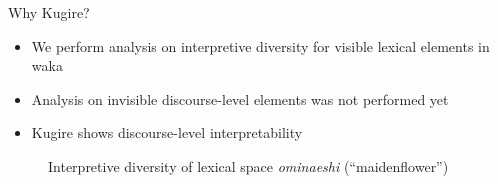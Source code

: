 \begin{block}{Why Kugire?}
\begin{itemize}
\item We perform analysis on interpretive diversity for visible lexical elements in waka
\item Analysis on invisible discourse-level elements was not performed yet
\item Kugire shows discourse-level interpretability
\end{itemize}

\vspace{-\dimexpr\parskip+\topsep+\partopsep+\parsep+.65\baselineskip\relax}
{\setlength{\intextsep}{0pt}%
\setlength{\textfloatsep}{0pt}%
\setlength{\floatsep}{0pt}%
\begin{figure}[H]
\begin{minipage}[t]{0.55\linewidth}
  \centering
  
  \setcounter{figure}{1}
  \caption{Interpretive diversity of the predicate of \textit{miru} (see)}
\end{minipage}%
\hfill
\begin{minipage}[t]{0.42\linewidth}
  \centering
  
  \setcounter{figure}{2}
  \caption{Interpretive diversity of lexical space \textit{ominaeshi} (``maidenflower'')}
\end{minipage}
\end{figure}
}
\end{block}
